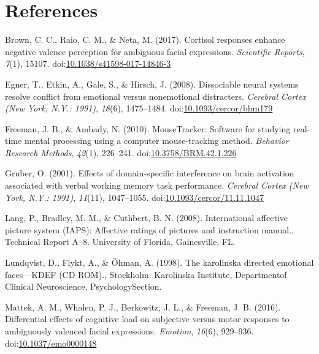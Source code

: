 \documentclass[man]{apa6}
\begin{document}
\newpage

\hypertarget{references}{%
\section{References}\label{references}}

\begingroup
\setlength{\parindent}{-0.5in}
\setlength{\leftskip}{0.5in}

\hypertarget{refs}{}
\leavevmode\hypertarget{ref-brown_cortisol_2017}{}%
Brown, C. C., Raio, C. M., \& Neta, M. (2017). Cortisol responses enhance negative valence perception for ambiguous facial expressions. \emph{Scientific Reports}, \emph{7}(1), 15107. doi:\href{https://doi.org/10.1038/s41598-017-14846-3}{10.1038/s41598-017-14846-3}

\leavevmode\hypertarget{ref-egner_dissociable_2008}{}%
Egner, T., Etkin, A., Gale, S., \& Hirsch, J. (2008). Dissociable neural systems resolve conflict from emotional versus nonemotional distracters. \emph{Cerebral Cortex (New York, N.Y.: 1991)}, \emph{18}(6), 1475--1484. doi:\href{https://doi.org/10.1093/cercor/bhm179}{10.1093/cercor/bhm179}

\leavevmode\hypertarget{ref-freeman_mousetracker:_2010}{}%
Freeman, J. B., \& Ambady, N. (2010). MouseTracker: Software for studying real-time mental processing using a computer mouse-tracking method. \emph{Behavior Research Methods}, \emph{42}(1), 226--241. doi:\href{https://doi.org/10.3758/BRM.42.1.226}{10.3758/BRM.42.1.226}

\leavevmode\hypertarget{ref-gruber_effects_2001}{}%
Gruber, O. (2001). Effects of domain-specific interference on brain activation associated with verbal working memory task performance. \emph{Cerebral Cortex (New York, N.Y.: 1991)}, \emph{11}(11), 1047--1055. doi:\href{https://doi.org/10.1093/cercor/11.11.1047}{10.1093/cercor/11.11.1047}

\leavevmode\hypertarget{ref-lang_international_2008}{}%
Lang, P., Bradley, M. M., \& Cuthbert, B. N. (2008). International affective picture system (IAPS): Affective ratings of pictures and instruction manual., Technical Report A--8. University of Florida, Gainesville, FL.

\leavevmode\hypertarget{ref-lundqvist_karolinska_1998}{}%
Lundqvist, D., Flykt, A., \& Öhman, A. (1998). The karolinska directed emotional faces---KDEF (CD ROM)., Stockholm: Karolinska Institute, Departmentof Clinical Neuroscience, PsychologySection.

\leavevmode\hypertarget{ref-mattek_differential_2016}{}%
Mattek, A. M., Whalen, P. J., Berkowitz, J. L., \& Freeman, J. B. (2016). Differential effects of cognitive load on subjective versus motor responses to ambiguously valenced facial expressions. \emph{Emotion}, \emph{16}(6), 929--936. doi:\href{https://doi.org/10.1037/emo0000148}{10.1037/emo0000148}
\end{document}
